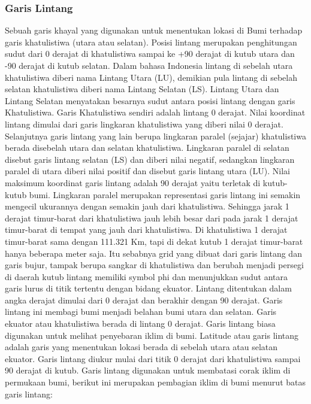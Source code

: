 \subsubsection{Garis Lintang}

Sebuah garis khayal yang digunakan untuk menentukan lokasi di Bumi terhadap garis khatulistiwa (utara atau selatan). Posisi lintang merupakan penghitungan sudut dari 0 derajat di khatulistiwa sampai ke +90 derajat di kutub utara dan -90 derajat di kutub selatan. Dalam bahasa Indonesia lintang di sebelah utara khatulistiwa diberi nama Lintang Utara (LU), demikian pula lintang di sebelah selatan khatulistiwa diberi nama Lintang Selatan (LS). Lintang Utara dan Lintang Selatan menyatakan besarnya sudut antara posisi lintang dengan garis Khatulistiwa. Garis Khatulistiwa sendiri adalah lintang 0 derajat. 
Nilai koordinat lintang dimulai dari garis lingkaran khatulistiwa yang diberi nilai 0 derajat. Selanjutnya garis lintang yang lain berupa lingkaran paralel (sejajar) khatulistiwa berada disebelah utara dan selatan khatulistiwa. Lingkaran paralel di selatan disebut garis lintang selatan (LS) dan diberi nilai negatif, sedangkan lingkaran paralel di utara diberi nilai positif dan disebut garis lintang utara (LU). Nilai maksimum koordinat garis lintang adalah 90 derajat yaitu terletak di kutub-kutub bumi. 
Lingkaran paralel merupakan representasi garis lintang ini semakin mengecil ukurannya dengan semakin jauh dari khatulistiwa. Sehingga jarak 1 derajat timur-barat dari khatulistiwa jauh lebih besar dari pada jarak 1 derajat timur-barat di tempat yang jauh dari khatulistiwa. Di khatulistiwa 1 derajat timur-barat sama dengan 111.321 Km, tapi di dekat kutub 1 derajat timur-barat hanya beberapa meter saja. Itu sebabnya grid yang dibuat dari garis lintang dan garis bujur, tampak berupa sangkar di khatulistiwa dan berubah menjadi persegi di daerah kutub
lintang memiliki symbol phi dan menunjukkan sudut antara garis lurus di titik tertentu dengan bidang ekuator. Lintang ditentukan dalam angka derajat dimulai dari 0 derajat dan berakhir dengan 90 derajat. Garis lintang ini membagi bumi menjadi belahan bumi utara dan selatan. Garis ekuator atau khatulistiwa berada di lintang 0 derajat. Garis lintang biasa digunakan untuk melihat penyebaran iklim di bumi.
Latitude atau garis lintang adalah garis yang menentukan lokasi berada di sebelah utara atau selatan ekuator. Garis lintang diukur mulai dari titik 0 derajat dari khatulistiwa sampai 90 derajat di kutub. Garis lintang digunakan untuk membatasi corak iklim di permukaan bumi, berikut ini merupakan pembagian iklim di bumi menurut batas garis lintang:

